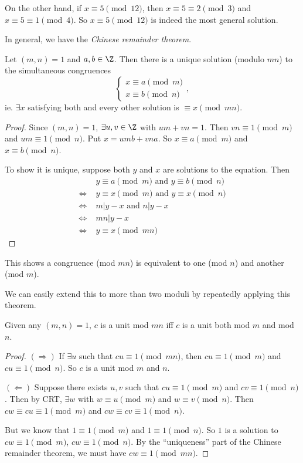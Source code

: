 \documentclass[a4paper]{article}
\begin{document}
On the other hand, if $x\equiv 5\pmod {12}$, then $x\equiv 5\equiv 2 \pmod 3$ and $x\equiv 5\equiv 1\pmod 4$. So $x\equiv 5\pmod {12}$ is indeed the most general solution.

In general, we have the \emph{Chinese remainder theorem}.
\begin{thm}
  Let $(m, n) = 1$ and $a, b\in \Z$. Then there is a unique solution (modulo $mn$) to the simultaneous congruences
  \[
    \begin{cases}x\equiv a\pmod m \\ x\equiv b\pmod n \end{cases},
  \]
  ie. $\exists x$ satisfying both and every other solution is $\equiv x \pmod {mn}$.
\end{thm}

\begin{proof}
  Since $(m, n) = 1$, $\exists u, v\in \Z$ with $um + vn = 1$. Then $vn \equiv 1\pmod m$ and $um \equiv 1 \pmod n$. Put $x = umb + vna$. So $x\equiv a\pmod m$ and $x\equiv b\pmod n$.

  To show it is unique, suppose both $y$ and $x$ are solutions to the equation. Then
  \begin{align*}
    &\; y \equiv a\pmod m \text{ and } y \equiv b\pmod n\\
    \Leftrightarrow &\; y \equiv x\pmod m \text{ and } y\equiv x\pmod n\\
    \Leftrightarrow &\; m | y - x\text{ and } n | y - x\\
    \Leftrightarrow &\; mn | y - x\\
    \Leftrightarrow &\; y \equiv x\pmod {mn}
  \end{align*}
\end{proof}
This shows a congruence (mod $mn$) is equivalent to one (mod $n$) and another (mod $m$).

We can easily extend this to more than two moduli by repeatedly applying this theorem.

\begin{prop}
  Given any $(m,n) = 1$, $c$ is a unit mod $mn$ iff $c$ is a unit both mod $m$ and mod $n$.
\end{prop}

\begin{proof}
  $(\Rightarrow)$ If $\exists u$ such that $cu \equiv 1 \pmod {mn}$, then $cu \equiv 1\pmod m$ and $cu\equiv 1\pmod n$. So $c$ is a unit mod $m$ and $n$.

  $(\Leftarrow)$ Suppose there exists $u, v$ such that $cu\equiv 1\pmod m$ and $cv \equiv 1\pmod n$. Then by CRT, $\exists w$ with $w\equiv u \pmod m$ and $w\equiv v\pmod n$. Then $cw\equiv cu\equiv 1\pmod m$ and $cw\equiv cv\equiv 1\pmod n$.

  But we know that $1\equiv 1\pmod m$ and $1\equiv 1\pmod n$. So $1$ is a solution to $cw \equiv 1\pmod m$, $cw\equiv 1\pmod n$. By the ``uniqueness'' part of the Chinese remainder theorem, we must have $cw\equiv 1\pmod {mn}$.
\end{proof}
\end{document}
